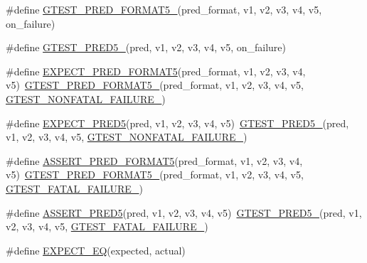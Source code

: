 \begin{DoxyCompactItemize}
\item 
\#define \hyperlink{fused-src_2gtest_2gtest_8h_a107623ee191560f703a3fdc983803c8e}{\-G\-T\-E\-S\-T\-\_\-\-P\-R\-E\-D\-\_\-\-F\-O\-R\-M\-A\-T5\-\_\-}(pred\-\_\-format, v1, v2, v3, v4, v5, on\-\_\-failure)
\item 
\#define \hyperlink{fused-src_2gtest_2gtest_8h_a2c42692f7d910dc2fe57869883190e6c}{\-G\-T\-E\-S\-T\-\_\-\-P\-R\-E\-D5\-\_\-}(pred, v1, v2, v3, v4, v5, on\-\_\-failure)
\item 
\#define \hyperlink{fused-src_2gtest_2gtest_8h_a74beddf9661e4460f9969fe211b9e80e}{\-E\-X\-P\-E\-C\-T\-\_\-\-P\-R\-E\-D\-\_\-\-F\-O\-R\-M\-A\-T5}(pred\-\_\-format, v1, v2, v3, v4, v5)~\hyperlink{gtest__pred__impl_8h_a107623ee191560f703a3fdc983803c8e}{\-G\-T\-E\-S\-T\-\_\-\-P\-R\-E\-D\-\_\-\-F\-O\-R\-M\-A\-T5\-\_\-}(pred\-\_\-format, v1, v2, v3, v4, v5, \hyperlink{gtest-internal_8h_a6cb7482cfa03661a91c698eb5895f642}{\-G\-T\-E\-S\-T\-\_\-\-N\-O\-N\-F\-A\-T\-A\-L\-\_\-\-F\-A\-I\-L\-U\-R\-E\-\_\-})
\item 
\#define \hyperlink{fused-src_2gtest_2gtest_8h_adbfcc13f3b3d14c42a7fbd41573932bf}{\-E\-X\-P\-E\-C\-T\-\_\-\-P\-R\-E\-D5}(pred, v1, v2, v3, v4, v5)~\hyperlink{gtest__pred__impl_8h_a2c42692f7d910dc2fe57869883190e6c}{\-G\-T\-E\-S\-T\-\_\-\-P\-R\-E\-D5\-\_\-}(pred, v1, v2, v3, v4, v5, \hyperlink{gtest-internal_8h_a6cb7482cfa03661a91c698eb5895f642}{\-G\-T\-E\-S\-T\-\_\-\-N\-O\-N\-F\-A\-T\-A\-L\-\_\-\-F\-A\-I\-L\-U\-R\-E\-\_\-})
\item 
\#define \hyperlink{fused-src_2gtest_2gtest_8h_abd7cb4f36d6aa2cb346ab3ac812568f3}{\-A\-S\-S\-E\-R\-T\-\_\-\-P\-R\-E\-D\-\_\-\-F\-O\-R\-M\-A\-T5}(pred\-\_\-format, v1, v2, v3, v4, v5)~\hyperlink{gtest__pred__impl_8h_a107623ee191560f703a3fdc983803c8e}{\-G\-T\-E\-S\-T\-\_\-\-P\-R\-E\-D\-\_\-\-F\-O\-R\-M\-A\-T5\-\_\-}(pred\-\_\-format, v1, v2, v3, v4, v5, \hyperlink{gtest-internal_8h_a0f9a4c3ea82cc7bf4478eaffdc168358}{\-G\-T\-E\-S\-T\-\_\-\-F\-A\-T\-A\-L\-\_\-\-F\-A\-I\-L\-U\-R\-E\-\_\-})
\item 
\#define \hyperlink{fused-src_2gtest_2gtest_8h_af8e510af2b4a14d90eef66ace17d1c30}{\-A\-S\-S\-E\-R\-T\-\_\-\-P\-R\-E\-D5}(pred, v1, v2, v3, v4, v5)~\hyperlink{gtest__pred__impl_8h_a2c42692f7d910dc2fe57869883190e6c}{\-G\-T\-E\-S\-T\-\_\-\-P\-R\-E\-D5\-\_\-}(pred, v1, v2, v3, v4, v5, \hyperlink{gtest-internal_8h_a0f9a4c3ea82cc7bf4478eaffdc168358}{\-G\-T\-E\-S\-T\-\_\-\-F\-A\-T\-A\-L\-\_\-\-F\-A\-I\-L\-U\-R\-E\-\_\-})
\item 
\#define \hyperlink{fused-src_2gtest_2gtest_8h_aff8385840165a184edc29446aa51936f}{\-E\-X\-P\-E\-C\-T\-\_\-\-E\-Q}(expected, actual)

\end{DoxyCompactItemize}
